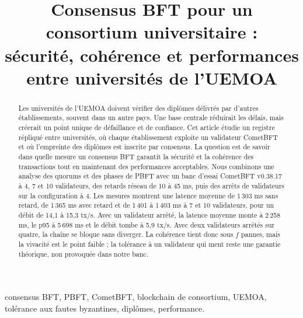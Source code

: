 \documentclass[conference]{IEEEtran}
\begin{document}
\renewcommand{\abstractname}{Résumé}
\renewcommand{\IEEEkeywordsname}{Mots-clés}

\title{Consensus BFT pour un consortium universitaire :\\
sécurité, cohérence et performances entre universités de l'UEMOA}

\author{%
}

\maketitle

\begin{abstract}
Les universités de l'UEMOA doivent vérifier des diplômes délivrés par d'autres établissements, souvent dans un autre pays. Une base centrale réduirait les délais, mais créerait un point unique de défaillance et de confiance. Cet article étudie un registre répliqué entre universités, où chaque établissement exploite un validateur CometBFT et où l'empreinte des diplômes est inscrite par consensus. La question est de savoir dans quelle mesure un consensus BFT garantit la sécurité et la cohérence des transactions tout en maintenant des performances acceptables. Nous combinons une analyse des quorums et des phases de PBFT avec un banc d'essai CometBFT v0.38.17 à 4, 7 et 10 validateurs, des retards réseau de 10 à 45 ms, puis des arrêts de validateurs sur la configuration à 4. Les mesures montrent une latence moyenne de 1\,303 ms sans retard, de 1\,365 ms avec retard et de 1\,401 à 1\,403 ms à 7 et 10 validateurs, pour un débit de 14,1 à 15,3 tx/s. Avec un validateur arrêté, la latence moyenne monte à 2\,258 ms, le p95 à 5\,698 ms et le débit tombe à 5,9 tx/s. Avec deux validateurs arrêtés sur quatre, la chaîne se bloque sans diverger. La cohérence tient donc sous $f$ pannes, mais la vivacité est le point faible ; la tolérance à un validateur qui ment reste une garantie théorique, non provoquée dans notre banc.
\end{abstract}

\begin{IEEEkeywords}
consensus BFT, PBFT, CometBFT, blockchain de consortium, UEMOA, tolérance aux fautes byzantines, diplômes, performance.
\end{IEEEkeywords}
\end{document}
